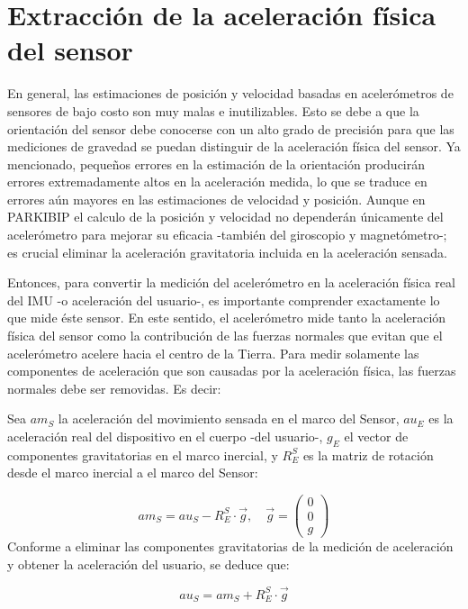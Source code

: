 
\section{Extracción de la aceleración física del sensor}

En general, las estimaciones de posición y velocidad basadas en acelerómetros de sensores de bajo costo son muy malas e inutilizables. Esto se debe a que la orientación del sensor debe conocerse con un alto grado de precisión para que las mediciones de gravedad se puedan distinguir de la aceleración física del sensor. Ya mencionado, pequeños errores en la estimación de la orientación producirán errores extremadamente altos en la aceleración medida, lo que se traduce en errores aún mayores en las estimaciones de velocidad y posición. Aunque en PARKIBIP el calculo de la posición y velocidad no dependerán únicamente del acelerómetro para mejorar su eficacia -también del giroscopio y magnetómetro-; es crucial eliminar la aceleración gravitatoria incluida en la aceleración sensada.

Entonces, para convertir la medición del acelerómetro en la aceleración física real del IMU -o aceleración del usuario-, es importante comprender exactamente lo que mide éste sensor. En este sentido, el acelerómetro mide tanto la aceleración física del sensor como la contribución de las fuerzas normales que evitan que el acelerómetro acelere hacia el centro de la Tierra. Para medir solamente las componentes de aceleración que son causadas por la aceleración física, las fuerzas normales debe ser removidas. Es decir:

\noindent Sea $am_{S}$ la aceleración del movimiento sensada en el marco del Sensor, $au_{E}$ es la aceleración real del dispositivo en el cuerpo -del usuario-, $g_{E}$ el vector de componentes gravitatorias en el marco inercial, y $R_E^S$ es la matriz de rotación desde el marco inercial a el marco del Sensor:

\[
    am_{S} = au_{S} - R_E^S \cdot \vec{g}, \quad \vec{g} =   \begin{pmatrix}
      0\\
      0\\ 
      g
\end{pmatrix} 
\]  
\noindent Conforme a eliminar las componentes gravitatorias de la medición de aceleración y obtener la aceleración del usuario, se deduce que:

\begin{equation*}
     au_{S} = am_{S} + R_E^S \cdot \vec{g} 
\end{equation*}

